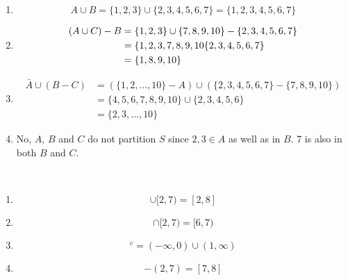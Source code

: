 
 
\begin{problem}{1} $ $
	\begin{enumerate}
		
		\item 
			\begin{equation} 
				A \cup B = \{1, 2, 3\} \cup \{2, 3, 4, 5, 6, 7 \} =  \{1, 2, 3, 4, 5, 6, 7 \}  \nonumber
			\end{equation}
		
		\item 
			\begin{align}
				(A \cup C) - B &= \{1, 2, 3\} \cup \{ 7, 8, 9, 10\} -  \{2, 3, 4, 5, 6, 7 \} \nonumber \\
				&=  \{1, 2, 3, 7, 8, 9, 10\-  \{2, 3, 4, 5, 6, 7 \} \nonumber \\
				& = \{ 1, 8, 9, 10\} \nonumber
			\end{align}
			
		\item 
			\begin{align}
				\bar A \cup (B-C) & = (\{1, 2, \ldots, 10 \}-A) \cup \left (\{2, 3, 4, 5, 6, 7 \} - \{7, 8, 9, 10 \} \right) \nonumber \\
				&= \{4, 5, 6, 7, 8, 9, 10\} \cup \{ 2, 3, 4, 5, 6 \} \nonumber \\
				& = \{2, 3, \ldots, 10 \} \nonumber
			\end{align}
			
		\item No, $A$, $B$ and $C$ do not partition $S$ since $2, 3 \in A$ as well as in $B$.  7 is also in both $B$ and $C$.		

	\end{enumerate}
\end{problem}



\begin{problem}{2} $ $
	\begin{enumerate}
		
		\item 
			\begin{equation} 
				[6, 8]\cup [2, 7)= [2, 8] \nonumber
			\end{equation}
		
		\item 
			\begin{equation} 
				[6, 8]\cap [2, 7)= [6, 7) \nonumber
			\end{equation}
			
		\item 
			\begin{equation} 
				[0, 1]^c = (-\infty, 0) \cup (1, \infty) \nonumber
			\end{equation}
		\item
			\begin{equation} 
				[6, 8] - (2, 7) = [7, 8] \nonumber
			\end{equation} 

	\end{enumerate}
\end{problem}


